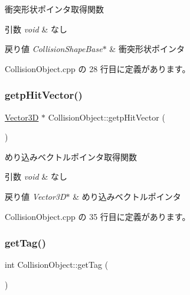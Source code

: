 衝突形状ポインタ取得関数 


\begin{DoxyParams}{引数}
{\em void} & なし \\
\hline
\end{DoxyParams}

\begin{DoxyRetVals}{戻り値}
{\em Collision\+Shape\+Base$\ast$} & 衝突形状ポインタ \\
\hline
\end{DoxyRetVals}


 Collision\+Object.\+cpp の 28 行目に定義があります。

\mbox{\label{class_collision_object_a9c004b1cd134290efa386049103b1140}} 
\subsubsection{\texorpdfstring{getp\+Hit\+Vector()}{getpHitVector()}}
{\footnotesize\ttfamily \mbox{\hyperlink{class_vector3_d}{Vector3D}} $\ast$ Collision\+Object\+::getp\+Hit\+Vector (\begin{DoxyParamCaption}{ }\end{DoxyParamCaption})}



めり込みベクトルポインタ取得関数 


\begin{DoxyParams}{引数}
{\em void} & なし \\
\hline
\end{DoxyParams}

\begin{DoxyRetVals}{戻り値}
{\em Vector3\+D$\ast$} & めり込みベクトルポインタ \\
\hline
\end{DoxyRetVals}


 Collision\+Object.\+cpp の 35 行目に定義があります。

\mbox{\label{class_collision_object_a0a34797b95ae9bc9908f95ed51caffbb}} 
\subsubsection{\texorpdfstring{get\+Tag()}{getTag()}}
{\footnotesize\ttfamily int Collision\+Object\+::get\+Tag (\begin{DoxyParamCaption}{ }\end{DoxyParamCaption})}



